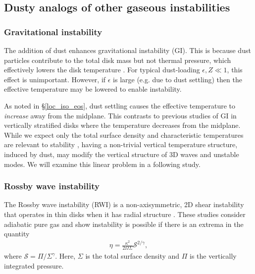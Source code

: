 \subsection{Dusty analogs of other gaseous instabilities}  


\subsubsection{Gravitational instability} %
The addition of dust enhances gravitational
instability (GI). This is because dust particles contribute to the
total disk mass but not thermal pressure, which effectively lowers the
disk temperature \citep[][]{thompson88,shi13}. For typical dust-loading 
$\epsilon, Z\ll1$, this effect is unimportant. However, if $\epsilon$ is
large (e.g. due to dust settling) then the effective temperature may 
be lowered to enable instability. 

As noted in \S\ref{loc_iso_eos}, dust settling causes the effective
temperature to \emph{increase} away from the midplane. This contrasts
to previous studies of GI in vertically stratified disks
\citep[e.g.][]{mamat10, kim12,lin14c} where the temperature decreases
from the midplane. While we expect only the total surface density and
characteristic temperatures are relevant to stability  
\citep{toomre64}, having a non-trivial vertical temperature
structure, induced by dust, may modify the vertical structure of 3D
waves and unstable modes. We will examine this linear problem in a following 
study.  




\subsubsection{Rossby wave instability}
The Rossby wave instability (RWI) is a non-axisymmetric, 2D shear
instability that operates in thin disks when it has radial structure
\citep{lovelace99,li00}. These studies consider adiabatic pure gas and 
show instability is possible if there is an extrema in the quantity
\begin{align}
 \eta = \frac{\kappa^2}{2\Omega\Sigma}\mathcal{S}^{2/\gamma},  
\end{align} 
where $\mathcal{S} = \Pi/\Sigma^\gamma$. Here, $\Sigma$ is the total
surface density and $\Pi$ is the vertically integrated pressure. 

